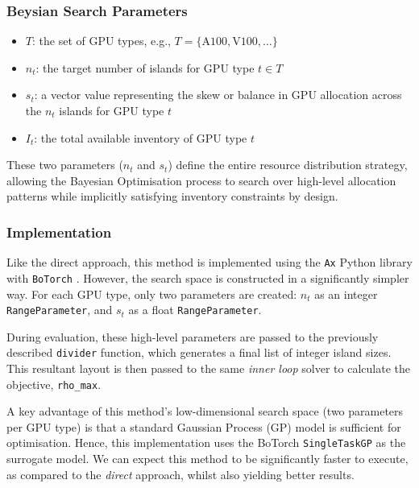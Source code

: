 \subsubsection*{Beysian Search Parameters}

\begin{itemize}
    \item \( T \): the set of GPU types, e.g., \( T = \{\text{A100}, \text{V100}, \ldots\} \)
    \item \( n_t \): the target number of islands for GPU type \( t \in T \)
    \item \( s_t \): a vector value representing the skew or balance in GPU allocation across the \( n_t \) islands for GPU type \( t \)
    \item \( I_t \): the total available inventory of GPU type \( t \)
\end{itemize}

These two parameters (\( n_t \) and \( s_t \)) define the entire resource distribution strategy, allowing the Bayesian Optimisation process to search over high-level allocation patterns while implicitly satisfying inventory constraints by design.

\clearpage
\subsubsection*{Implementation}

Like the direct approach, this method is implemented using the \texttt{Ax} \autocite{FacebookAx2025} Python library with \texttt{BoTorch} \autocite{PytorchBotorch2025}.
However, the search space is constructed in a significantly simpler way.
For each GPU type, only two parameters are created:  \( n_t \) as an integer \texttt{RangeParameter}, and \( s_t \) as a float \texttt{RangeParameter}.

During evaluation, these high-level parameters are passed to the previously described \texttt{divider} function, which generates a final list of integer island sizes.
This resultant layout is then passed to the same \textit{inner loop} solver to calculate the objective, \texttt{rho\_max}.

A key advantage of this method's low-dimensional search space (two parameters per GPU type) is that a standard Gaussian Process (GP) model is sufficient for optimisation.
Hence, this implementation uses the BoTorch \texttt{SingleTaskGP} as the surrogate model.
We can expect this method to be significantly faster to execute, as compared to the \textit{direct} approach, whilst also yielding better results.

